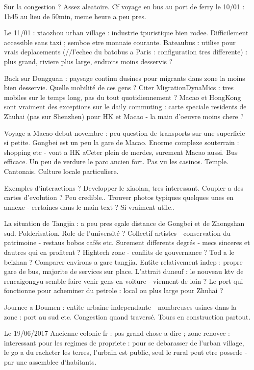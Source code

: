 Sur la congestion ? Assez aleatoire. Cf voyage en bus au port de ferry le 10/01 : 1h45 au lieu de 50min, meme heure a peu pres.

Le 11/01 : xiaozhou urban village : industrie tpuristique bien rodee. Difficilement accessible sans taxi ; semboe etre monnaie courante. Bateaubus : utilise pour vrais deplacements (//l'echec du batobus a Paris : configuration tres differente) : plus grand, riviere plus large, endroits moins desservis ?

Back sur Dongguan : paysage continu dusines pour migrants dans zone la moins bien desservie. Quelle mobilité de ces gens ? Citer MigrationDynaMics : tres mobiles sur le temps long, pas du tout quotidiennement ? Macao et HongKong sont vraiment des exceptions sur le daily commuting : carte speciale residents de Zhuhai (pas sur Shenzhen) pour HK et Macao - la main d'oeuvre moins chere ?

Voyage a Macao debut novembre : peu question de transports sur une superficie si petite. Gongbei est un peu la gare de Macao. Enorme complexe souterrain : shopping etc - vont a HK aCeter plein de merdes, surement Macao aussi. Bus efficace. Un peu de verdure le parc ancien fort. Pas vu les casinos. Temple. Cantonais. Culture locale particuliere.

Exemples d'interactions ? Developper le xiaolan, tres interessant. Coupler a des cartes d'evolution ? Peu credible..
Trouver photos typiques quelques unes en annexe - certaines dans le main text ? Si vraiment utile..

La situation de Tangjia : a peu pres egale distance de Gongbei et de Zhongshan sud. Polderisation. Role de l'université ? Collectif artistes - conservation du patrimoine - restaus bobos cafés etc. Surement differents degrés - mecs sinceres et dautres qui en profitent ? Hightech zone - conflits de gouvernance ? Tod a le beizhan ? Comparer environs a gare tangjia. Entite relativement indep : propre gare de bus, majorite de services sur place. L'attrait duneuf : le nouveau ktv de rencaigongyu semble faire venir gens en voiture - viennent de loin ?
Le port qui fonctionne pour acheminer du petrole : local ou plus large pour Zhuhai ?

Journee a Doumen : entite urbaine independante - nombreuses usines dans la zone : port au sud etc. Congestion quand traversé. Tours en construction partout.

Le 19/06/2017
Ancienne colonie fr : pas grand chose a dire ; zone renovee : interessant pour les regimes de propriete : pour se debarasser de l'urban village, le go a du racheter les terres, l'urbain est public, seul le rural peut etre possede - par une assemblee d'habitants.

